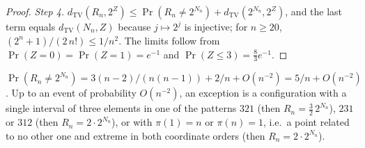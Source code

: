 \begin{proof}
\emph{Step 4.} $d_{\mathrm{TV}}(R_n,2^Z)\le\Pr(R_n\ne2^{N_n})+d_{\mathrm{TV}}(2^{N_n},2^Z)$, and the last term equals $d_{\mathrm{TV}}(N_n,Z)$ because $j\mapsto2^j$ is injective; for $n\ge20$, $(2^n+1)/(2\,n!)\le1/n^2$. The limits follow from $\Pr(Z=0)=\Pr(Z=1)=e^{-1}$ and $\Pr(Z\le3)=\tfrac83e^{-1}$.
\end{proof}

\begin{proposition}\label{prop:exceptions}
$\Pr(R_n\ne2^{N_n})=3(n-2)/(n(n-1))+2/n+O(n^{-2})=5/n+O(n^{-2})$. Up to an event of probability $O(n^{-2})$, an exception is a configuration with a single interval of three elements in one of the patterns $321$ (then $R_n=\tfrac32\,2^{N_n}$), $231$ or $312$ (then $R_n=2\cdot2^{N_n}$), or with $\pi(1)=n$ or $\pi(n)=1$, i.e.\ a point related to no other one and extreme in both coordinate orders (then $R_n=2\cdot2^{N_n}$). 
\end{proposition}
